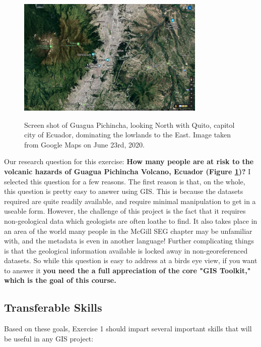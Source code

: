 \documentclass{article}
\begin{document}
\begin{figure}[htbp]
    \centering
    \includegraphics[width=0.8\textwidth]{Google Map Overview of GP and Quito.png}
    \label{fig:fig1}
    \caption{Screen shot of Guagua Pichincha, looking North with Quito, capitol city of Ecuador, dominating the lowlands to the East. Image taken from Google Maps on June 23rd, 2020. }
\end{figure}

Our research question for this exercise: \textbf{How many people are at risk to the volcanic hazards of Guagua Pichincha Volcano, Ecuador (Figure \ref{fig:fig1})?} I selected this question for a few reasons. The first reason is that, on the whole, this question is pretty easy to answer using GIS. This is because the datasets required are quite readily available, and require minimal manipulation to get in a useable form. However, the challenge of this project is the fact that it requires non-geological data which geologists are often loathe to find. It also takes place in an area of the world many people in the McGill SEG chapter may be unfamiliar with, and the metadata is even in another language! Further complicating things is that the geological information available is locked away in non-georeferenced datasets. So while this question is easy to address at a birds eye view, if you want to answer it \textbf{you need the a full appreciation of the core "GIS Toolkit," which is the goal of this course.}

\subsection{Transferable Skills}

Based on these goals, Exercise 1 should impart several important skills that will be useful in any GIS project:
\end{document}
